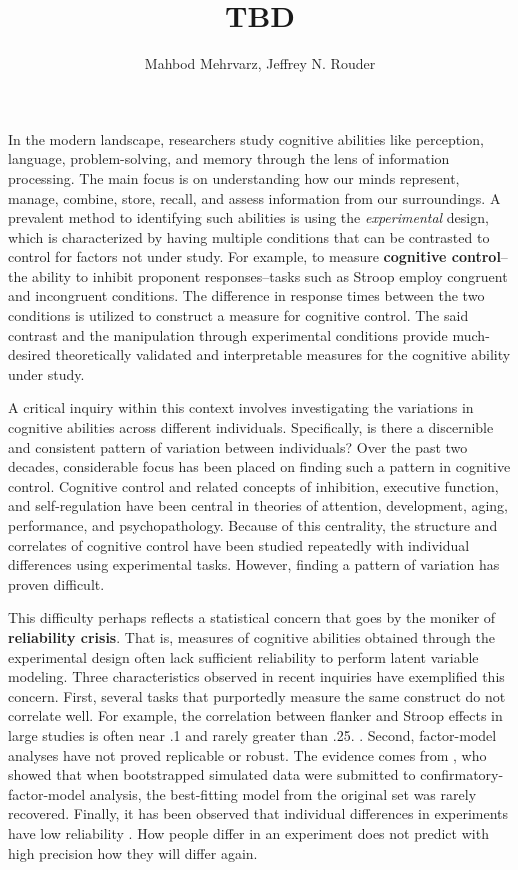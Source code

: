 \documentclass[man, 12pt]{apa7} %
\title{TBD}
\author{Mahbod Mehrvarz, Jeffrey N. Rouder}
\affiliation{{University of California, Irvine}}
\begin{document}
\maketitle



In the modern landscape, researchers study cognitive abilities like perception, language, problem-solving, and memory through the lens of information processing. The main focus is on understanding how our minds represent, manage, combine, store, recall, and assess information from our surroundings. A prevalent method to identifying such abilities is using the \textit{experimental} design, which is characterized by having multiple conditions that can be contrasted to control for factors not under study. For example, to measure \textbf{cognitive control}--the ability to inhibit proponent responses--tasks such as Stroop employ congruent and incongruent conditions. The difference in response times between the two conditions is utilized to construct a measure for cognitive control. The said contrast and the manipulation through experimental conditions provide much-desired theoretically validated and interpretable measures for the cognitive ability under study. 

A critical inquiry within this context involves investigating the variations in cognitive abilities across different individuals. Specifically, is there a discernible and consistent pattern of variation between individuals? Over the past two decades, considerable focus has been placed on finding such a pattern in cognitive control. Cognitive control and related concepts of inhibition, executive function, and self-regulation have been central in theories of attention, development, aging, performance, and psychopathology. Because of this centrality, the structure and correlates of cognitive control have been studied repeatedly with individual differences using experimental tasks. However, finding a pattern of variation has proven difficult. 

This difficulty perhaps reflects a statistical concern that goes by the moniker of \textbf{reliability crisis}. That is, measures of cognitive abilities obtained through the experimental design often lack sufficient reliability to perform latent variable modeling. Three characteristics observed in recent inquiries have exemplified this concern. First, several tasks that purportedly measure the same construct do not correlate well. For example, the correlation between flanker and Stroop effects in large studies is often near .1 and rarely greater than .25. \parencite{Enkavi.etal.2019, Rey-Mermet.etal.2019, Rouder.etal.2023}. Second, factor-model analyses have not proved replicable or robust.  The evidence comes from \Textcite{Karr.etal.2018}, who showed that when bootstrapped simulated data were submitted to confirmatory-factor-model analysis, the best-fitting model from the original set was rarely recovered. Finally, it has been observed that individual differences in experiments have low reliability \parencite{Hedge.etal.2018, Draheim.etal.2019}.  How people differ in an experiment does not predict with high precision how they will differ again.
\end{document}
